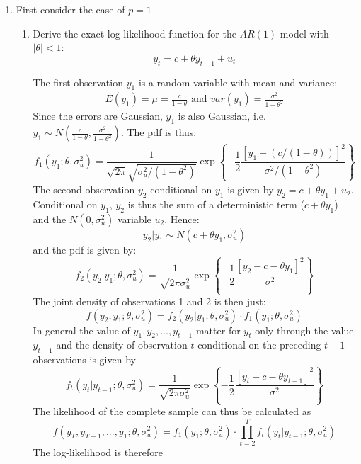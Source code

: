\begin{enumerate}
    \item First consider the case of $p=1$
          \begin{enumerate}
              \item Derive the exact log-likelihood function for the $AR(1)$ model with $|\theta|<1$:
                    $$y_t = c + \theta y_{t-1} + u_t$$
                    \begin{solution}
                        The first observation $y_1$ is a random variable with mean and variance:
                        \begin{align*}
                            E(y_1) = \mu = \frac{c}{1-\theta} \text{ and } var(y_1) = \frac{\sigma^2}{1-\theta^2}
                        \end{align*}
                        Since the errors are Gaussian, $y_1$ is also Gaussian, i.e. $y_1 \sim N\left(\frac{c}{1-\theta},\frac{\sigma^2}{1-\theta^2}\right)$. The pdf is thus:
                        $$f_1(y_1;\theta,\sigma_u^2) = \frac{1}{\sqrt{2\pi}\sqrt{\sigma_u^2/(1-\theta^2)}}\exp\left\{-\frac{1}{2}\frac{[y_1-(c/(1-\theta))]^2}{\sigma^2/(1-\theta^2)}\right\}$$
                        The second observation $y_2$ conditional on $y_1$ is given by $y_2 = c + \theta y_1 + u_2$. Conditional on $y_1$, $y_2$ is thus the sum of a deterministic term ($c+\theta y_1$) and the $N(0,\sigma_u^2)$ variable $u_2$. Hence:
                        $$ y_2|y_1 \sim N(c+\theta y_1,\sigma_u^2)$$ and the pdf is given by:
                        $$f_2(y_2|y_1;\theta,\sigma_u^2) = \frac{1}{\sqrt{2\pi\sigma_u^2}}\exp\left\{-\frac{1}{2}\frac{[y_2-c-\theta y_1]^2}{\sigma^2}\right\}$$
                        The joint density of observations 1 and 2 is then just:
                        $$f(y_2,y_1;\theta,\sigma_u^2) = f_2(y_2|y_1;\theta,\sigma_u^2)\cdot f_1(y_1;\theta,\sigma_u^2)$$
                        In general the value of $y_1,y_2,...,y_{t-1}$ matter for $y_t$ only through the value $y_{t-1}$ and the density of observation $t$ conditional on the preceding $t-1$ observations is given by
                        $$f_t(y_t|y_{t-1};\theta,\sigma_u^2) = \frac{1}{\sqrt{2\pi\sigma_u^2}}\exp\left\{-\frac{1}{2}\frac{[y_t-c-\theta y_{t-1}]^2}{\sigma^2}\right\}$$
                        The likelihood of the complete sample can thus be calculated as
                        $$f(y_T,y_{T-1},...,y_1;\theta,\sigma_u^2)=f_1(y_1;\theta,\sigma_u^2)\cdot \prod_{t=2}^{T}f_t(y_t|y_{t-1};\theta,\sigma_u^2)$$ The log-likelihood is therefore
                        \begin{align*}

\end{align*}
\end{solution}
\end{enumerate}
\end{enumerate}
